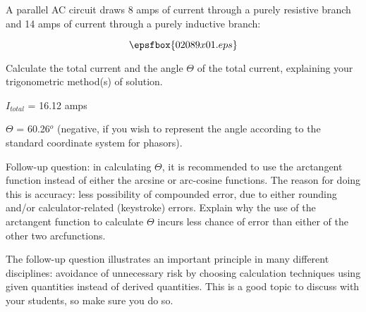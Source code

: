 

A parallel AC circuit draws 8 amps of current through a purely resistive branch and 14 amps of current through a purely inductive branch:

$$\epsfbox{02089x01.eps}$$

Calculate the total current and the angle $\Theta$ of the total current, explaining your trigonometric method(s) of solution.







$I_{total}$ = 16.12 amps

$\Theta$ = 60.26$^{o}$ (negative, if you wish to represent the angle according to the standard coordinate system for phasors).

\vskip 10pt

Follow-up question: in calculating $\Theta$, it is recommended to use the arctangent function instead of either the arcsine or arc-cosine functions.  The reason for doing this is accuracy: less possibility of compounded error, due to either rounding and/or calculator-related (keystroke) errors.  Explain why the use of the arctangent function to calculate $\Theta$ incurs less chance of error than either of the other two arcfunctions.







The follow-up question illustrates an important principle in many different disciplines: avoidance of unnecessary risk by choosing calculation techniques using given quantities instead of derived quantities.  This is a good topic to discuss with your students, so make sure you do so.




